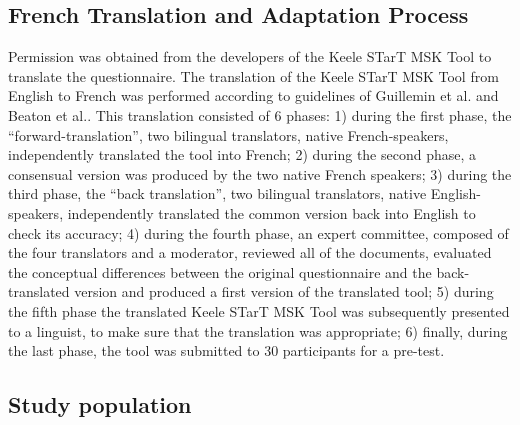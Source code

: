 \subsection{French Translation and Adaptation Process}
Permission was obtained from the developers of the Keele STarT MSK Tool to translate the questionnaire. The translation of the Keele STarT MSK Tool from English to French was performed according to guidelines of Guillemin et al.\citep{guillemin1993cross} and Beaton et al.\citep{beaton2000guidelines}. This translation consisted of 6 phases: 1) during the first phase, the “forward-translation”, two bilingual translators, native French-speakers, independently translated the tool into French; 2) during the second phase, a consensual version was produced by the two native French speakers; 3) during the third phase, the “back translation”, two bilingual translators, native English-speakers, independently translated the common version back into English to check its accuracy; 4) during the fourth phase, an expert committee, composed of the four translators and a moderator, reviewed all of the documents, evaluated the conceptual differences between the original questionnaire and the back-translated version and produced a first version of the translated tool; 5) during the fifth phase the translated Keele STarT MSK Tool was subsequently presented to a linguist, to make sure that the translation was appropriate; 6) finally, during the last phase, the tool was submitted to 30 participants for a pre-test. 

\medbreak

\subsection{Study population}

